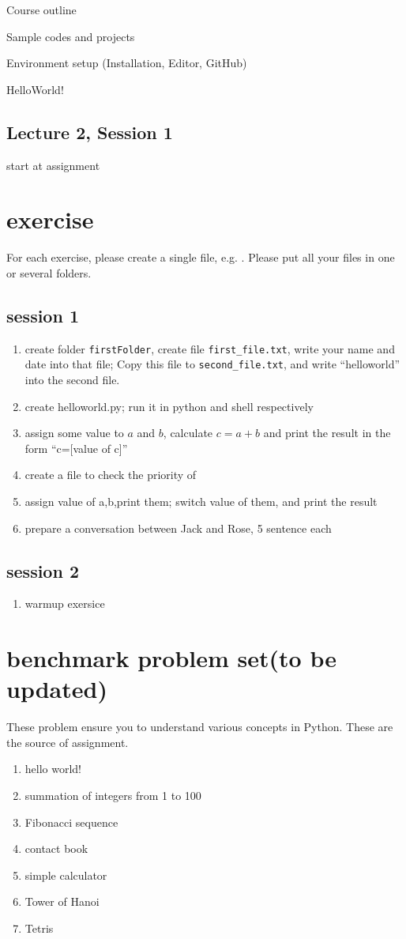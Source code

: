 \documentclass[aps,prb,12pt,tightenlines,%
notitlepage,longbibliography]{revtex4-1}
\begin{document}
Course outline

Sample codes and projects

Environment setup (Installation, Editor, GitHub)

HelloWorld!

\subsection{Lecture 2, Session 1}
start at assignment

\section{exercise}
For each exercise, please create a single  file, e.g. . Please put
all your files in one or several folders.
\subsection{session 1}
\begin{enumerate}
  \item
    create folder \texttt{firstFolder}, create file
    \texttt{first\_file.txt}, write your name and date into that file;
    Copy this file to \texttt{second\_file.txt}, and write
    ``helloworld'' into the second file.
  \item
    create helloworld.py; run it in python and shell respectively
  \item
    assign some value to $a$ and $b$, calculate $c=a+b$ and print the
    result in the form ``c=[value of c]''
  \item
    create a file to check the priority of \code{+-*/=}
  \item
    assign value of a,b,print them; switch value of them, and print
    the result

  \item
    prepare a conversation between Jack and Rose, 5 sentence each
\end{enumerate}

\subsection{session 2}
\begin{enumerate}
\item
  warmup exersice
\end{enumerate}


\section{benchmark problem set(to be updated)}
These problem ensure you to understand various concepts in
Python. These are the source of assignment.

\begin{enumerate}
\item hello world!
\item summation of integers from 1 to 100
\item Fibonacci sequence
\item contact book
\item simple calculator
\item Tower of Hanoi
\item Tetris  

\end{enumerate}
  


\end{document}
